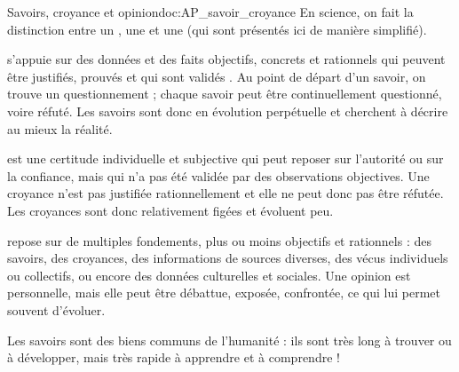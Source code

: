 \teteSndAP



\begin{doc}{Savoirs, croyance et opinion}{doc:AP_savoir_croyance}
  En science, on fait la distinction entre un , une  et une  (qui sont présentés ici de manière simplifié).

  \begin{listePoints}
    \item
     s'appuie sur des données et des faits objectifs, concrets et rationnels qui peuvent être justifiés, prouvés et qui sont validés .
    Au point de départ d'un savoir, on trouve un questionnement ; chaque savoir peut être continuellement questionné, voire réfuté.
    Les savoirs sont donc en évolution perpétuelle et cherchent à décrire au mieux la réalité.
 
    \item 
     est une certitude individuelle et subjective qui peut reposer sur l'autorité ou sur la confiance, mais qui n'a pas été validée par des observations objectives.
    Une croyance n'est pas justifiée rationnellement et elle ne peut donc pas être réfutée.
    Les croyances sont donc relativement figées et évoluent peu.
  
    \item
     repose sur de multiples fondements, plus ou moins objectifs et rationnels : des savoirs, des croyances, des informations de sources diverses, des vécus individuels ou collectifs, ou encore des données culturelles et sociales.
    Une opinion est personnelle, mais elle peut être débattue, exposée, confrontée, ce qui lui permet souvent d'évoluer.
  \end{listePoints}

  Les savoirs sont des biens communs de l'humanité : ils sont très long à trouver ou à développer, mais très rapide à apprendre et à comprendre !
\end{doc}



